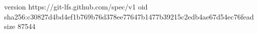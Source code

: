 version https://git-lfs.github.com/spec/v1
oid sha256:c30827d4bd4ef1b769b76d378ee77647b1477b39215c2edb4ae67d54ec76fead
size 87544
